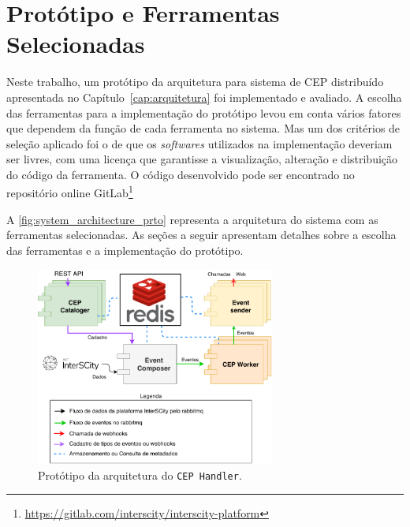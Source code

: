 \chapter{Protótipo e Ferramentas Selecionadas}
\label{cap:prototype}






Neste trabalho, um protótipo da arquitetura para sistema de CEP distribuído apresentada no Capítulo~\ref{cap:arquitetura} foi implementado e avaliado. 
A escolha das ferramentas para a implementação do protótipo levou em conta vários fatores que dependem da função de cada ferramenta no sistema. Mas um dos critérios de seleção aplicado foi o de que os \textit{softwares} utilizados na implementação deveriam ser livres, com uma licença que garantisse a visualização,  alteração e distribuição do código da ferramenta. O código desenvolvido pode ser encontrado no repositório online GitLab\footnote{\url{https://gitlab.com/interscity/interscity-platform}}

A \autoref{fig:system_architecture_prto} representa a arquitetura do sistema com as ferramentas selecionadas.
As seções a seguir apresentam detalhes sobre a escolha das ferramentas e a implementação do protótipo.


\begin{figure}[hb!]
      \centering
      \includegraphics[width=0.7\textwidth]{figuras/graphics/prot_dia.pdf}
      \caption{Protótipo da arquitetura do \texttt{CEP Handler}.}
      \label{fig:system_architecture_prto}
\end{figure}

